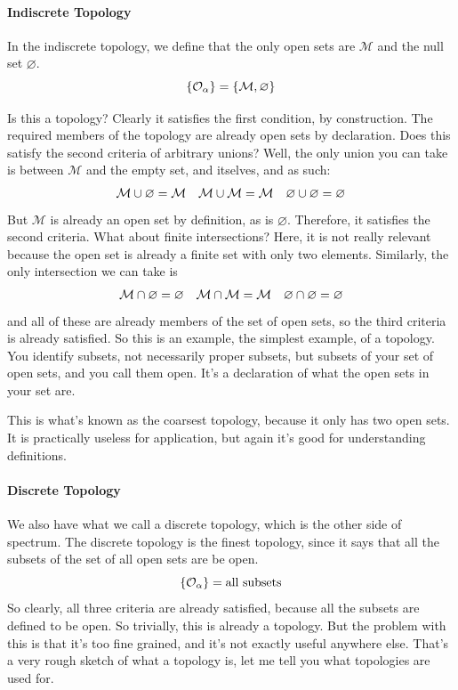 		\paragraph{Indiscrete Topology}

		In the indiscrete topology, we define that the only open sets are $\mathcal M$ and the null set $\varnothing$. 
		\[
			\qty{\mathcal{O}_\alpha} = \qty{\mathcal{M},\varnothing}
		\]	

		Is this a topology? Clearly it satisfies the first condition, by construction. The required members of the topology are already open sets by declaration.
		Does this satisfy the second criteria of arbitrary unions? Well, the only union you can take is between $\mathcal M$ and the empty set, and itselves, and as such:
		\begin{align*}
			\mathcal{M} \cup \varnothing = \mathcal M &&
			\mathcal{M} \cup \mathcal{M} = \mathcal{M}&&
			\varnothing \cup \varnothing = \varnothing
		\end{align*}
		But $\mathcal M$ is already an open set by definition, as is $\varnothing$. Therefore, it satisfies the second criteria. What about finite intersections? Here, it is not really relevant
		because the open set is already a finite set with only two elements. Similarly, the only intersection we can take is 
		\begin{align*}
			\mathcal{M} \cap \varnothing = \varnothing &&
			\mathcal{M} \cap \mathcal{M} = \mathcal{M}&&
			\varnothing \cap \varnothing = \varnothing
		\end{align*}
		and all of these are already members of the set of open sets, so the third criteria is already satisfied. So this is an example, the simplest example, of a topology.
		You identify subsets, not necessarily proper subsets, but subsets of your set of open sets, and you call them open. It's a declaration of what the open sets in your set are. 
		
		This is what's known as the coarsest topology, because it only has two open sets. It is practically useless for application, but again it's good for understanding definitions.
		\paragraph{Discrete Topology}
		We also have what we call a discrete topology, which is the other side of spectrum. The discrete topology is the finest topology, since it says that all the subsets of the set 
		of all open sets are be open.
		\[
			\qty{\mathcal{O}_\alpha} = \text{all subsets}
		\]
		So clearly, all three criteria are already satisfied, because all the subsets are defined to be open. So trivially, this is already
		a topology. But the problem with this is that it's too fine grained, and it's not exactly useful anywhere else. 
		That's a very rough sketch of what a topology is, let me tell you what topologies are used for.

